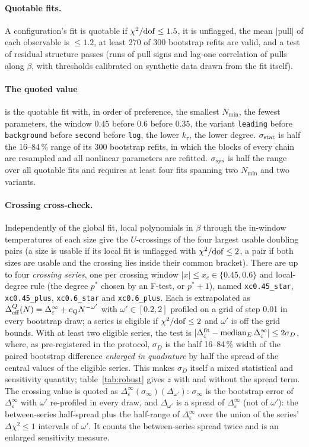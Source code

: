 \documentclass[10pt,a4paper]{article}
\newcommand{\De}{\Delta_\varepsilon}
\newcommand{\Deff}{\Delta_{\rm eff}}
\newcommand{\code}[1]{\texttt{#1}}
\newcommand{\sstat}{\sigma_{\rm stat}}
\newcommand{\ssys}{\sigma_{\rm sys}}
\newcommand{\ktau}{k_\tau}
\begin{document}
\paragraph{Quotable fits.} A configuration's fit is quotable if $\chi^2/{\rm dof}\le1.5$, it is unflagged, the mean $|$pull$|$ of each observable is
$\le1.2$, at least 270 of 300 bootstrap refits are valid, and a test of residual structure passes (runs of pull signs and lag-one correlation
of pulls along $\beta$, with thresholds calibrated on synthetic data drawn from the fit itself).

\paragraph{The quoted value} is the quotable fit with, in order of preference, the smallest $N_{\min}$, the fewest parameters, the window
$0.45$ before $0.6$ before $0.35$, the variant \code{leading} before \code{background} before \code{second} before \code{log}, the lower $\ktau$,
the lower degree. $\sstat$ is half the 16--84\,\% range of its 300 bootstrap refits, in which the blocks of every chain are resampled and all nonlinear
parameters are refitted. $\ssys$ is
half the range over all quotable fits and requires at least four fits spanning two $N_{\min}$ and two variants.

\paragraph{Crossing cross-check.} Independently of the global fit, local polynomials in $\beta$ through the in-window temperatures of each size
give the $U$-crossings of the four largest usable doubling pairs (a size is usable if its local fit is unflagged with $\chi^2/{\rm dof}\le2$,
a pair if both sizes are usable and the crossing lies inside their common bracket). There are up to four \emph{crossing series}, one per
crossing window $|x|\le x_c\in\{0.45,0.6\}$ and local-degree rule (the degree $p^*$ chosen by an F-test, or $p^*+1$), named
\code{xc0.45\_star}, \code{xc0.45\_plus}, \code{xc0.6\_star} and \code{xc0.6\_plus}. Each is extrapolated as $\Deff^Q(N)=\De^\infty+c_QN^{-\omega'}$ with $\omega'\in[0.2,2]$ profiled on a grid of step 0.01 in every
bootstrap draw; a series is eligible if $\chi^2/{\rm dof}\le2$ and $\omega'$ is off the grid bounds. With at least two eligible series, the test
is $|\De^{\rm fit}-{\rm median}_E\,\De^\infty|\le2\sigma_D$, where, as pre-registered in the protocol, $\sigma_D$ is the half 16--84\,\% width of
the paired bootstrap difference \emph{enlarged in quadrature} by half the spread of the central values of the eligible series. This makes
$\sigma_D$ itself a mixed statistical and sensitivity quantity; table~\ref{tab:robust} gives $z$ with and without the spread term. The crossing
value is quoted as $\De^\infty(\sigma_\infty)(\Delta_{\omega'})$: $\sigma_\infty$ is the bootstrap error of $\De^\infty$ with $\omega'$
re-profiled in every draw, and $\Delta_{\omega'}$ is a spread of $\De^\infty$ (not of $\omega'$): the between-series half-spread plus the
half-range of $\De^\infty$ over the union of the series' $\Delta\chi^2\le1$ intervals of $\omega'$. It counts the between-series spread twice
and is an enlarged sensitivity measure.
\end{document}
